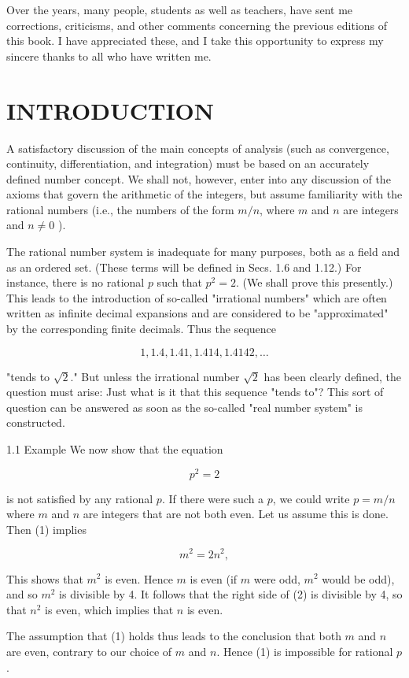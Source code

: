 \documentclass[10pt]{article}
\begin{document}
Over the years, many people, students as well as teachers, have sent me corrections, criticisms, and other comments concerning the previous editions of this book. I have appreciated these, and I take this opportunity to express my sincere thanks to all who have written me.

\section{INTRODUCTION}
A satisfactory discussion of the main concepts of analysis (such as convergence, continuity, differentiation, and integration) must be based on an accurately defined number concept. We shall not, however, enter into any discussion of the axioms that govern the arithmetic of the integers, but assume familiarity with the rational numbers (i.e., the numbers of the form $m / n$, where $m$ and $n$ are integers and $n \neq 0$ ).

The rational number system is inadequate for many purposes, both as a field and as an ordered set. (These terms will be defined in Secs. 1.6 and 1.12.) For instance, there is no rational $p$ such that $p^{2}=2$. (We shall prove this presently.) This leads to the introduction of so-called "irrational numbers" which are often written as infinite decimal expansions and are considered to be "approximated" by the corresponding finite decimals. Thus the sequence

$$
1,1.4,1.41,1.414,1.4142, \ldots
$$

"tends to $\sqrt{2}$." But unless the irrational number $\sqrt{2}$ has been clearly defined, the question must arise: Just what is it that this sequence "tends to"? This sort of question can be answered as soon as the so-called "real number system" is constructed.

1.1 Example We now show that the equation

$$
p^{2}=2
$$

is not satisfied by any rational $p$. If there were such a $p$, we could write $p=m / n$ where $m$ and $n$ are integers that are not both even. Let us assume this is done. Then (1) implies

$$
m^{2}=2 n^{2},
$$

This shows that $m^{2}$ is even. Hence $m$ is even (if $m$ were odd, $m^{2}$ would be odd), and so $m^{2}$ is divisible by 4. It follows that the right side of (2) is divisible by 4, so that $n^{2}$ is even, which implies that $n$ is even.

The assumption that (1) holds thus leads to the conclusion that both $m$ and $n$ are even, contrary to our choice of $m$ and $n$. Hence (1) is impossible for rational $p$.
\end{document}
